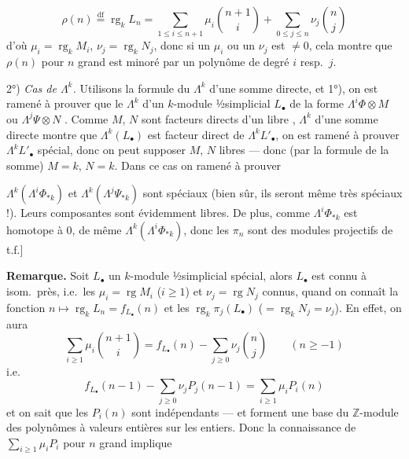 \documentclass[11pt,a4paper]{article}
\begin{document}
\[
  \rho(n) \overset{\mathrm{df}}{=} \operatorname{rg}_{k} L_{n} =
  \sum_{1 \leqslant i \leqslant n+1} \mu_{i} \binom{n+1}{i} +
  \sum_{0 \leqslant j \leqslant n} \nu_{j} \binom{n}{j}
\]
d'où $\mu_{i} = \operatorname{rg}_{k} M_{i}$, $\nu_{j} =
\operatorname{rg}_{k} N_{j}$, donc si  un
$\mu_{i}$ ou un $\nu_{j}$ est $\neq 0$, cela montre que $\rho(n)$ pour $n$
grand est minoré par un polynôme de degré $i$ resp.\ $j$.

2°) \emph{Cas de $\Lambda^{k}$.} Utilisons la formule du $\Lambda^{k}$ d'une
somme directe, et 1°), on est ramené à prouver que le $\Lambda^{k}$ d'un
$k$-module ½simplicial $L_{\bullet}$ de la forme $\Lambda^{i}\Phi \otimes M$
ou $\Lambda^{j}\Psi \otimes N$ \ill{}. Comme $M$, $N$ sont facteurs directs
d'un libre , 
\struck{\ill{}}  $\Lambda^{k}$
d'une somme directe \ill{} montre que $\Lambda^{k}(L_{\bullet})$ est facteur
direct de $\Lambda^{k}L'_{\bullet}$, on est ramené à prouver
$\Lambda^{k}L'_{\bullet}$ spécial, donc \ill{} on peut supposer $M$, $N$
libres — donc (par la formule de la somme) $M = k$, $N = k$. Dans ce cas on
 ramené à prouver

$\Lambda^{k}(\Lambda^{i}\Phi_{*k})$ et $\Lambda^{k}(\Lambda^{j}\Psi_{*k})$
sont spéciaux (bien sûr, ils seront même très spéciaux !). Leurs
composantes sont évidemment libres. De plus, comme $\Lambda^{i}\Phi_{*k}$
est homotope à $0$, de même $\Lambda^{k}(\Lambda^{i}\Phi_{*k})$, donc
\ill{} les $\pi_{n}$ sont des modules \ill{} projectifs de t.f.]

\textbf{Remarque.} Soit $L_{\bullet}$ un $k$-module ½simplicial spécial,
alors $L_{\bullet}$ est connu à isom.\ près, i.e.\ les $\mu_{i} =
\operatorname{rg} M_{i}$ ($i \geqslant 1$) et $\nu_{j} = \operatorname{rg}
N_{j}$   connus, quand on connaît la
\struck{\ill{}} fonction $n \mapsto \operatorname{rg}_{k} L_{n} =
f_{L_{\bullet}}(n)$ \struck{\ill{}} et les $\operatorname{rg}_{k}
\pi_{j}(L_{\bullet})$ ($= \operatorname{rg}_{k} N_{j} = \nu_{j}$). En
effet, on aura
\[
  \sum_{i \geqslant 1} \mu_{i} \binom{n+1}{i} = f_{L_{\bullet}}(n) -
  \sum_{j \geqslant 0} \nu_{j} \binom{n}{j} \qquad (n \geqslant -1)
\]
 i.e.
\[
  f_{L_{\bullet}}(n-1) - \sum_{j \geqslant 0} \nu_{j} P_{j}(n-1) =
  \sum_{i \geqslant 1} \mu_{i} P_{i}(n)
\]
et on sait que les $P_{i}(n)$ \ill{} sont 
indépendants — et forment une base du $\mathbb{Z}$-module des polynômes
\ill{} à valeurs entières sur les entiers. Donc la connaissance de
$\sum_{i \geqslant 1} \mu_{i} P_{i}$ pour $n$ grand implique
\end{document}
